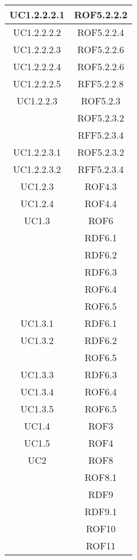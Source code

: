 \begin{longtable}{|c|c|}
\midrule
UC1.2.2.2.1
& ROF5.2.2.2\\

\midrule
UC1.2.2.2.2
& ROF5.2.2.4\\

\midrule
UC1.2.2.2.3
& ROF5.2.2.6\\

\midrule
UC1.2.2.2.4
& ROF5.2.2.6\\

\midrule
UC1.2.2.2.5
& RFF5.2.2.8\\

\midrule
UC1.2.2.3
& ROF5.2.3\\
& ROF5.2.3.2\\
& RFF5.2.3.4\\

\midrule
UC1.2.2.3.1
& ROF5.2.3.2\\

\midrule
UC1.2.2.3.2
& RFF5.2.3.4\\

\midrule
UC1.2.3
& ROF4.3\\

\midrule
UC1.2.4
& ROF4.4\\

\midrule
UC1.3
& ROF6\\
& RDF6.1\\
& RDF6.2\\
& RDF6.3\\
& ROF6.4\\
& ROF6.5\\

\midrule
UC1.3.1
& RDF6.1\\

\midrule
UC1.3.2
& RDF6.2\\
& ROF6.5\\

\midrule
UC1.3.3
& RDF6.3\\

\midrule
UC1.3.4
& ROF6.4\\

\midrule
UC1.3.5
& ROF6.5\\

\midrule
UC1.4
& ROF3\\

\midrule
UC1.5
& ROF4\\


\midrule
UC2
& ROF8\\
& ROF8.1\\
& RDF9\\
& RDF9.1\\
& ROF10\\
& ROF11\\


\end{longtable}
